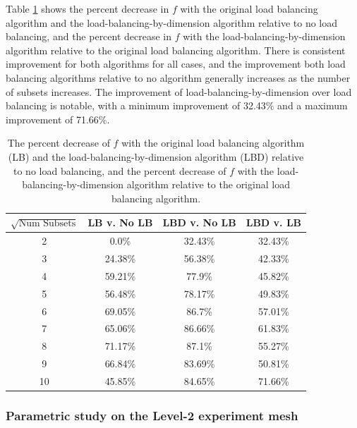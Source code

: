 \documentclass[times,final]{elsarticle}
\begin{document}
Table \ref{metric_improvement} shows the percent decrease in $f$ with the original load balancing algorithm and the load-balancing-by-dimension algorithm relative to no load balancing, and the percent decrease in $f$ with the load-balancing-by-dimension algorithm relative to the original load balancing algorithm.
There is consistent improvement for both algorithms for all cases, and the improvement both load balancing algorithms relative to no algorithm generally increases as the number of subsets increases. The improvement of load-balancing-by-dimension over load balancing is notable, with a minimum improvement of 32.43\% and a maximum improvement of 71.66\%.
\begin{table}[H]
\centering
\caption{The percent decrease of $f$ with the original load balancing algorithm (LB) and the load-balancing-by-dimension algorithm (LBD) relative to no load balancing, and the percent decrease of $f$ with the load-balancing-by-dimension algorithm relative to the original load balancing algorithm.}
\label{metric_improvement}
\begin{tabular}{c|c|c|c}
\centering
\textbf{$\sqrt{\text{Num Subsets}}$} & \textbf{LB v. No LB}  & \textbf{LBD v. No LB} & \textbf{LBD v. LB} \\ \hline
2&0.0\%&32.43\%&32.43\%\\ \hline
3&24.38\%&56.38\%&42.33\%\\ \hline
4&59.21\%&77.9\%&45.82\%\\ \hline
5&56.48\%&78.17\%&49.83\%\\ \hline
6&69.05\%&86.7\%&57.01\%\\ \hline
7&65.06\%&86.66\%&61.83\%\\ \hline
8&71.17\%&87.1\%&55.27\%\\ \hline
9&66.84\%&83.69\%&50.81\%\\ \hline
10&45.85\%&84.65\%&71.66\%
\end{tabular}
\end{table}

\FloatBarrier
\subsubsection{Parametric study on the Level-2 experiment mesh}
\end{document}
